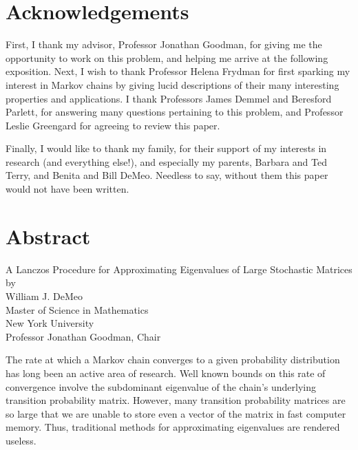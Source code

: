 \documentclass[12pt,letterpaper]{report}
\theoremstyle{plain}
\theoremstyle{definition}
\theoremstyle{remark}
\numberwithin{theorem}{chapter}
\numberwithin{claim}{chapter}
\numberwithin{equation}{chapter}
\numberwithin{conjecture}{chapter}
\newcommand\<{\ensuremath{\langle}}
\renewcommand\>{\ensuremath{\rangle}}
\begin{document}
\section*{Acknowledgements}
First, I thank my advisor, Professor Jonathan Goodman, for giving me the opportunity to work on
this problem, and helping me arrive at the following exposition. Next, I wish to thank Professor
Helena Frydman for ﬁrst sparking my interest in Markov chains by giving lucid descriptions of their
many interesting properties and applications. I thank Professors James Demmel and Beresford
Parlett, for answering many questions pertaining to this problem, and Professor Leslie Greengard
for agreeing to review this paper.

Finally, I would like to thank my family, for their support of my interests in research (and
everything else!), and especially my parents, Barbara and Ted Terry, and Benita and Bill DeMeo.
Needless to say, without them this paper would not have been written.


\newpage
\section*{Abstract}
\begin{center}
\newcommand\skipsize{6pt}
A Lanczos Procedure for Approximating Eigenvalues of Large Stochastic Matrices\\[\skipsize]
by\\[\skipsize]
William J. DeMeo\\[\skipsize]
Master of Science in Mathematics\\[\skipsize]
New York University\\[\skipsize]
Professor Jonathan Goodman, Chair
\end{center}

The rate at which a Markov chain converges to a given probability distribution
has long been an active area of research. Well known bounds on this rate of
convergence involve the subdominant eigenvalue of the chain's underlying
transition probability matrix. However, many transition probability matrices are
so large that we are unable to store even a vector of the matrix in fast
computer memory. Thus, traditional methods for approximating eigenvalues are
rendered useless. 
\end{document}
